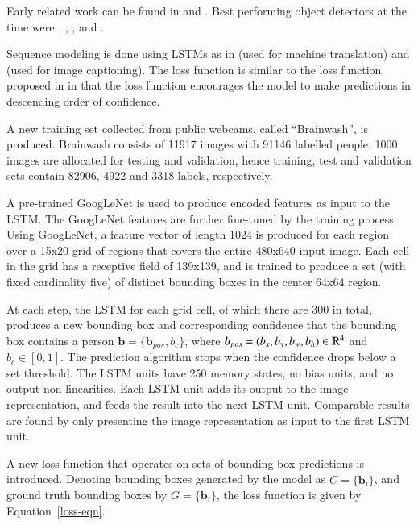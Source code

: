 \documentclass[a4paper, 12pt]{article}
\begin{document}
Early related work can be found in \cite{Felzenszwalb:2010:ODD:1850486.1850574}
and \cite{Leibe:2005:PDC:1068507.1069006}. Best performing object detectors at
the time were \cite{DBLP:journals/corr/GirshickDDM13},
\cite{DBLP:journals/corr/SermanetEZMFL13}, \cite{Uijlings13},
\cite{DBLP:journals/corr/ZhangBS15} and \cite{DBLP:journals/corr/SzegedyREA14}.

Sequence modeling is done using LSTMs as in
\cite{DBLP:journals/corr/SutskeverVL14} (used for machine translation) and
\cite{DBLP:journals/corr/KarpathyF14} (used for image captioning). The loss
function is similar to the loss function proposed in
\cite{Graves06connectionisttemporal} in that the loss function encourages the
model to make predictions in descending order of confidence.

A new training set collected from public webcams, called ``Brainwash'', is
produced. Brainwash consists of 11917 images with 91146 labelled people. 1000
images are allocated for testing and validation, hence training, test and
validation sets contain 82906, 4922 and 3318 labels, respectively.

A pre-trained GoogLeNet\cite{going-deeper-szegedy43022} is used to produce
encoded features as input to the LSTM. The GoogLeNet features are further
fine-tuned by the training process.  Using GoogLeNet, a feature vector of
length 1024 is produced for each region over a 15x20 grid of regions that
covers the entire 480x640 input image. Each cell in the grid has a receptive
field of 139x139, and is trained to produce a set (with fixed cardinality five)
of distinct bounding boxes in the center 64x64 region.

At each step, the LSTM for each grid cell, of which there are 300 in total,
produces a new bounding box and corresponding confidence that the bounding box
contains a person $\boldsymbol{b} = \{\boldsymbol{b}_{pos}, b_c\}$, where
$\boldsymbol{b}_{pos} = (b_x, b_y, b_w, b_h) \in \varmathbb{R}^4$ and
$b_c \in [0, 1]$. The prediction algorithm stops when the confidence drops
below a set threshold. The LSTM units have 250 memory states, no bias units,
and no output non-linearities. Each LSTM unit adds its output to the image
representation, and feeds the result into the next LSTM unit. Comparable
results are found by only presenting the image representation as input to the
first LSTM unit.

A new loss function that operates on sets of bounding-box predictions is
introduced. Denoting bounding boxes generated by the model as
$C = \{\tilde{\boldsymbol{b}}_i\}$, and ground truth bounding boxes by
$G = \{\boldsymbol{b}_i\}$, the loss function is given by
Equation~\ref{loss-eqn}.
\end{document}
